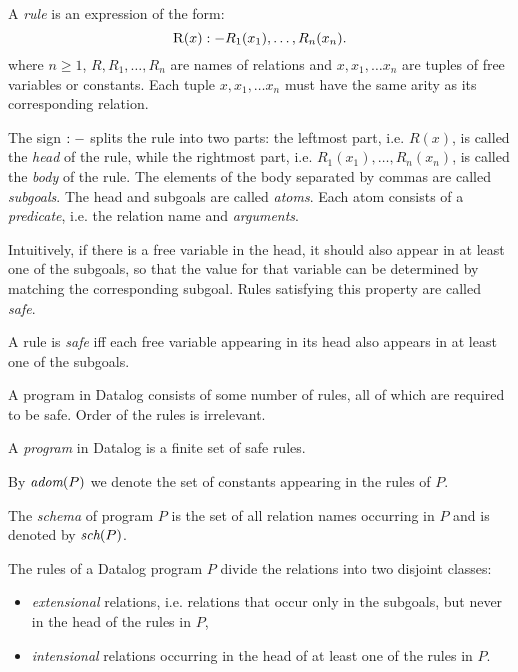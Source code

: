 \begin{defn}[Rule]\label{d:datalogrule}
A \emph{rule} is an expression of the form:
$$ \textsc{R}(x) :- R_1(x_1), \dots, R_n(x_n). $$
where $n \ge 1$, $R, R_1, \dots, R_n$ are names of relations and $x, x_1, \dots x_n$ are tuples of free variables or constants. Each tuple $x, x_1, \dots x_n$ must have the same arity as its corresponding relation.
\end{defn}

The sign $:-$ splits the rule into two parts: the leftmost part, i.e. $R(x)$, is called the \emph{head} of the rule, while the rightmost part, i.e. $R_1(x_1), \dots, R_n(x_n)$, is called the \emph{body} of the rule. The elements of the body separated by commas are called \emph{subgoals}. The head and subgoals are called \emph{atoms}. Each atom consists of a \emph{predicate}, i.e. the relation name and \emph{arguments}.

Intuitively, if there is a free variable in the head, it should also appear in at least one of the subgoals, so that the value for that variable can be determined by matching the corresponding subgoal. Rules satisfying this property are called \emph{safe}.

\begin{defn}\label{d:datalogsaferule}
A rule is \emph{safe} iff each free variable appearing in its head also appears in at least one of the subgoals.
\end{defn}

A program in Datalog consists of some number of rules, all of which are required to be safe. Order of the rules is irrelevant.

\begin{defn}\label{d:datalogprog}
A \emph{program} in Datalog is a finite set of safe rules.
\end{defn}

By $\textit{adom}(P)$ we denote the set of constants appearing in the rules of $P$.

The \emph{schema} of program $P$ is the set of all relation names occurring in $P$ and is denoted by $\textit{sch}(P)$.

\begin{defn}
The rules of a Datalog program $P$ divide the relations into two disjoint classes: 
\begin{itemize}
\item \emph{extensional} relations, i.e. relations that occur only in the subgoals, but never in the head of the rules in $P$,
\item \emph{intensional} relations occurring in the head of at least one of the rules in $P$.
\end{itemize}
\end{defn}

